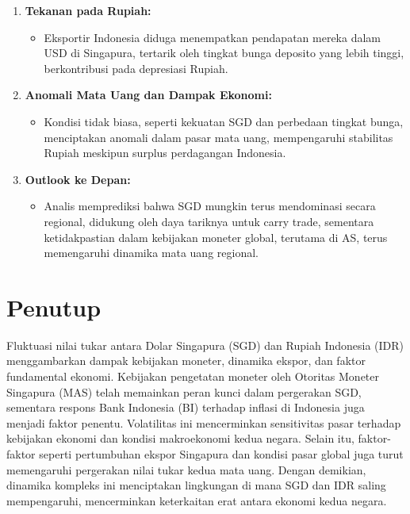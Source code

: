 \documentclass[12pt]{article}
\begin{document}
\begin{enumerate}
    \item \textbf{Tekanan pada Rupiah:}
    \begin{itemize}
        \item Eksportir Indonesia diduga menempatkan pendapatan mereka dalam USD di Singapura, tertarik oleh tingkat bunga deposito yang lebih tinggi, berkontribusi pada depresiasi Rupiah.
    \end{itemize}

    \item \textbf{Anomali Mata Uang dan Dampak Ekonomi:}
    \begin{itemize}
        \item Kondisi tidak biasa, seperti kekuatan SGD dan perbedaan tingkat bunga, menciptakan anomali dalam pasar mata uang, mempengaruhi stabilitas Rupiah meskipun surplus perdagangan Indonesia.
    \end{itemize}

    \item \textbf{Outlook ke Depan:}
    \begin{itemize}
        \item Analis memprediksi bahwa SGD mungkin terus mendominasi secara regional, didukung oleh daya tariknya untuk carry trade, sementara ketidakpastian dalam kebijakan moneter global, terutama di AS, terus memengaruhi dinamika mata uang regional. \autocite{Putu_Agus_Pransuamitra_2022_NOV_cnbcindonesia} \autocite{Putu_Agus_Pransuamitra_2022_DEC_cnbcindonesia}
    \end{itemize}
\end{enumerate}


\section{Penutup}
 Fluktuasi nilai tukar antara Dolar Singapura (SGD) dan Rupiah Indonesia (IDR) menggambarkan dampak kebijakan moneter, dinamika ekspor, dan faktor fundamental ekonomi. Kebijakan pengetatan moneter oleh Otoritas Moneter Singapura (MAS) telah memainkan peran kunci dalam pergerakan SGD, sementara respons Bank Indonesia (BI) terhadap inflasi di Indonesia juga menjadi faktor penentu. Volatilitas ini mencerminkan sensitivitas pasar terhadap kebijakan ekonomi dan kondisi makroekonomi kedua negara. Selain itu, faktor-faktor seperti pertumbuhan ekspor Singapura dan kondisi pasar global juga turut memengaruhi pergerakan nilai tukar kedua mata uang. Dengan demikian, dinamika kompleks ini menciptakan lingkungan di mana SGD dan IDR saling mempengaruhi, mencerminkan keterkaitan erat antara ekonomi kedua negara.

% 
% 

\printbibliography[title=Daftar Pustaka]
\end{document}
